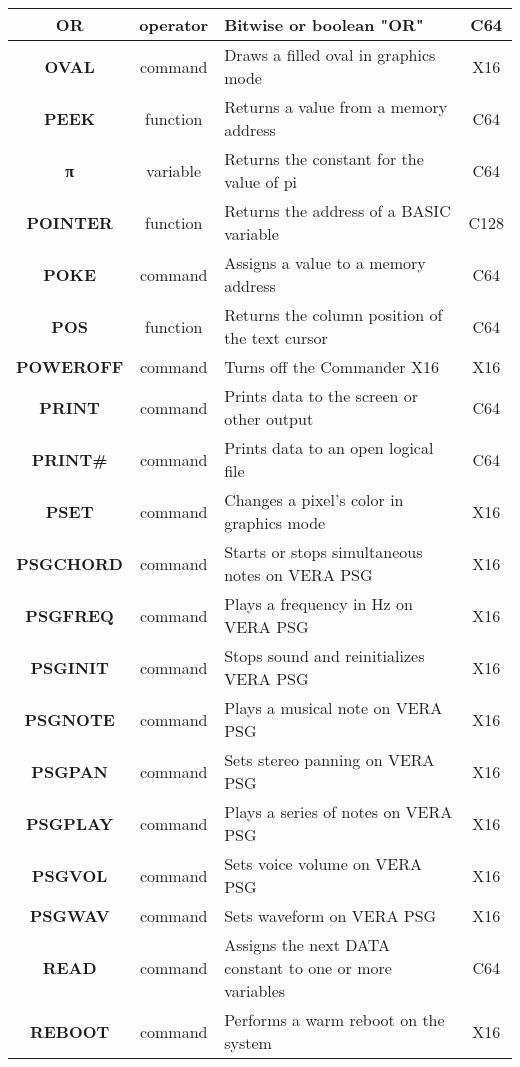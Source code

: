\begin{longtable}{|c|c|m{4cm}|c|}
	{\bfseries OR} & operator & Bitwise or boolean "OR" & C64 \\ \hline
	{\bfseries OVAL} & command & Draws a filled oval in graphics mode & X16 \\ \hline
	{\bfseries PEEK} & function & Returns a value from a memory address & C64 \\ \hline
	{\ttfamily\bfseries π} & variable & Returns the constant for the value of pi & C64 \\ \hline
	{\bfseries POINTER} & function & Returns the address of a BASIC variable & C128 \\ \hline
	{\bfseries POKE} & command & Assigns a value to a memory address & C64 \\ \hline
	{\bfseries POS} & function & Returns the column position of the text cursor & C64 \\ \hline
	{\bfseries POWEROFF} & command & Turns off the Commander X16 & X16 \\ \hline
	{\bfseries PRINT} & command & Prints data to the screen or other output & C64 \\ \hline
	{\bfseries PRINT\#} & command & Prints data to an open logical file & C64 \\ \hline
	{\bfseries PSET} & command & Changes a pixel's color in graphics mode & X16 \\ \hline
	{\bfseries PSGCHORD} & command & Starts or stops simultaneous notes on VERA PSG & X16 \\ \hline
	{\bfseries PSGFREQ} & command & Plays a frequency in Hz on VERA PSG & X16 \\ \hline
	{\bfseries PSGINIT} & command & Stops sound and reinitializes VERA PSG & X16 \\ \hline
	{\bfseries PSGNOTE} & command & Plays a musical note on VERA PSG & X16 \\ \hline
	{\bfseries PSGPAN} & command & Sets stereo panning on VERA PSG & X16 \\ \hline
	{\bfseries PSGPLAY} & command & Plays a series of notes on VERA PSG & X16 \\ \hline
	{\bfseries PSGVOL} & command & Sets voice volume on VERA PSG & X16 \\ \hline
	{\bfseries PSGWAV} & command & Sets waveform on VERA PSG & X16 \\ \hline
	{\bfseries READ} & command & Assigns the next {\ttfamily DATA} constant to one or more variables & C64 \\ \hline
	{\bfseries REBOOT} & command & Performs a warm reboot on the system & X16 \\ \hline

\end{longtable}
